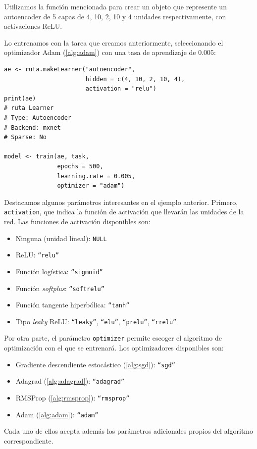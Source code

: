 \begin{example}\label{ex:ruta2}
  Utilizamos la función mencionada para crear un objeto que represente un autoencoder de 5 capas de 4, 10, 2, 10 y 4 unidades respectivamente, con activaciones ReLU.

  Lo entrenamos con la tarea que creamos anteriormente, seleccionando el optimizador Adam (\autoref{alg:adam}) con una tasa de aprendizaje de $0.005$:
  \begin{lstlisting}
ae <- ruta.makeLearner("autoencoder",
                       hidden = c(4, 10, 2, 10, 4),
                       activation = "relu")
print(ae)
# ruta Learner
# Type: Autoencoder
# Backend: mxnet
# Sparse: No

model <- train(ae, task,
               epochs = 500,
               learning.rate = 0.005,
               optimizer = "adam")
  \end{lstlisting}
\end{example}

Destacamos algunos parámetros interesantes en el ejemplo anterior. Primero, \texttt{activation}, que indica la función de activación que llevarán las unidades de la red. Las funciones de activación disponibles son:
\begin{itemize}
\item Ninguna (unidad lineal): \texttt{NULL}
\item ReLU: \texttt{``relu''}
\item Función logística: \texttt{``sigmoid''}
\item Función \emph{softplus}: \texttt{``softrelu''}
\item Función tangente hiperbólica: \texttt{``tanh''}
\item Tipo \emph{leaky} ReLU: \texttt{``leaky''}, \texttt{``elu''}, \texttt{``prelu''}, \texttt{``rrelu''}
\end{itemize}

Por otra parte, el parámetro \texttt{optimizer} permite escoger el algoritmo de optimización con el que se entrenará. Los optimizadores disponibles son:
\begin{itemize}
\item Gradiente descendiente estocástico (\autoref{alg:sgd}): \texttt{``sgd''}
\item Adagrad (\autoref{alg:adagrad}): \texttt{``adagrad''}
\item RMSProp (\autoref{alg:rmsprop}): \texttt{``rmsprop''}
\item Adam (\autoref{alg:adam}): \texttt{``adam''}
\end{itemize}
Cada uno de ellos acepta además los parámetros adicionales propios del algoritmo correspondiente.


